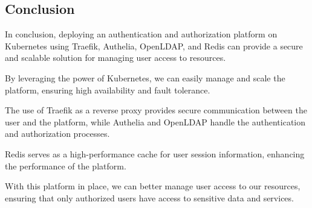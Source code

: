 \subsection*{Conclusion}

In conclusion, deploying an authentication and authorization platform on Kubernetes using Traefik, Authelia, OpenLDAP, and Redis can provide a secure and scalable solution for managing user access to resources. 

By leveraging the power of Kubernetes, we can easily manage and scale the platform, ensuring high availability and fault tolerance. 

The use of Traefik as a reverse proxy provides secure communication between the user and the platform, while Authelia and OpenLDAP handle the authentication and authorization processes. 

Redis serves as a high-performance cache for user session information, enhancing the performance of the platform. 

With this platform in place, we can better manage user access to our resources, ensuring that only authorized users have access to sensitive data and services.